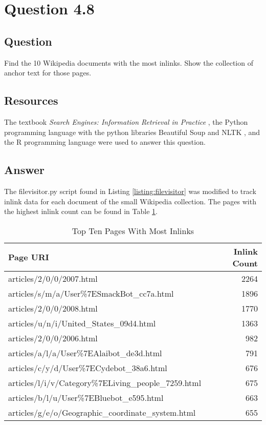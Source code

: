 \section{Question 4.8}

\subsection{Question}
Find the 10 Wikipedia documents with the most inlinks. Show the collection of anchor text for those pages.

\subsection{Resources}
The textbook \textit{Search Engines: Information Retrieval in Practice} \cite{seirip}, the Python programming language \cite{python} with the python libraries Beautiful Soup \cite{py:beautifulsoup} and NLTK \cite{py:nltk}, and the R programming language \cite{rlang} were used to answer this question.

\subsection{Answer}
The filevisitor.py script found in Listing \ref{listing:filevisitor} was modified to track inlink data for each document of the small Wikipedia collection.  The pages with the highest inlink count can be found in Table \ref{table:inlinks}.

\begin{table}[h!]
\begin{center}
  \begin{tabular}{ l r }
    \hline
    Page URI & Inlink Count \\
    \hline
    articles/2/0/0/2007.html & 2264 \\
    articles/s/m/a/User\%7ESmackBot\_cc7a.html & 1896 \\
    articles/2/0/0/2008.html & 1770 \\
    articles/u/n/i/United\_States\_09d4.html & 1363 \\
    articles/2/0/0/2006.html & 982 \\
    articles/a/l/a/User\%7EAlaibot\_de3d.html & 791 \\
    articles/c/y/d/User\%7ECydebot\_38a6.html & 676 \\
    articles/l/i/v/Category\%7ELiving\_people\_7259.html & 675 \\
    articles/b/l/u/User\%7EBluebot\_e595.html & 663 \\
    articles/g/e/o/Geographic\_coordinate\_system.html & 655 \\
    \hline
  \end{tabular}
\caption{Top Ten Pages With Most Inlinks}
\label{table:inlinks}
\end{center}
\end{table}